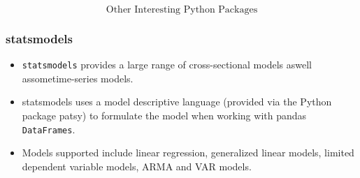 \documentclass[MASTER.tex]{subfiles}
\begin{document}
 
	
	
\begin{frame}
	\huge
\[ \mbox{Other Interesting Python Packages} \]
\end{frame}

\begin{frame}
	\frametitle{statsmodels}
	\large
	\begin{itemize}
	\item \texttt{statsmodels} provides a large range of cross-sectional models aswell assometime-series models. 
	\item statsmodels
	uses a model descriptive language (provided via the Python package patsy) to formulate the model
	when working with pandas \texttt{DataFrames}.
	\item Models supported include linear regression, generalized linear
	models, limited dependent variable models, ARMA and VAR models.
	\end{itemize}
\end{frame}
\end{document}
